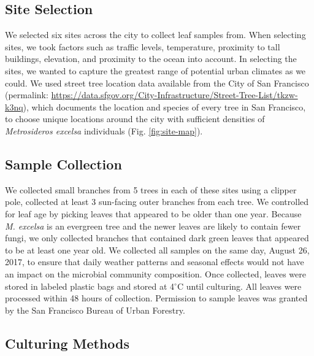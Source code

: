 \documentclass[fleqn,10pt,lineno]{wlpeerj} %
\begin{document}
\hypertarget{site-selection}{%
\subsection*{Site Selection}\label{site-selection}}

We selected six sites across the city to collect leaf samples from. When selecting sites, we took factors such as traffic levels, temperature, proximity to tall buildings, elevation, and proximity to the ocean into account. In selecting the sites, we wanted to capture the greatest range of potential urban climates as we could. We used street tree location data available from the City of San Francisco (permalink: \url{https://data.sfgov.org/City-Infrastructure/Street-Tree-List/tkzw-k3nq}), which documents the location and species of every tree in San Francisco, to choose unique locations around the city with sufficient densities of \emph{Metrosideros excelsa} individuals (Fig. \ref{fig:site-map}).

\hypertarget{sample-collection}{%
\subsection*{Sample Collection}\label{sample-collection}}

We collected small branches from 5 trees in each of these sites using a clipper pole, collected at least 3 sun-facing outer branches from each tree. We controlled for leaf age by picking leaves that appeared to be older than one year. Because \emph{M. excelsa} is an evergreen tree and the newer leaves are likely to contain fewer fungi, we only collected branches that contained dark green leaves that appeared to be at least one year old. We collected all samples on the same day, August 26, 2017, to ensure that daily weather patterns and seasonal effects would not have an impact on the microbial community composition. Once collected, leaves were stored in labeled plastic bags and stored at 4\(^{\circ}\)C until culturing. All leaves were processed within 48 hours of collection. Permission to sample leaves was granted by the San Francisco Bureau of Urban Forestry.

\hypertarget{culturing-methods}{%
\subsection*{Culturing Methods}\label{culturing-methods}}
\end{document}
